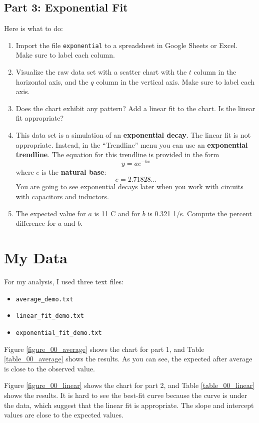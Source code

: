 \subsection{Part 3: Exponential Fit}
%
Here is what to do:
\begin{enumerate}
    \item Import the file \texttt{exponential} to a spreadsheet in Google Sheets or Excel. Make sure to label each column.
    \item Visualize the raw data set with a scatter chart with the $t$ column in the horizontal axis, and the $q$ column in the vertical axis. Make sure to label each axis.
    \item Does the chart exhibit any pattern? Add a linear fit to the chart. Is the linear fit appropriate?
    \item This data set is a simulation of an \textbf{exponential decay}. The linear fit is not appropriate. Instead, in the ``Trendline'' menu you can use an \textbf{exponential trendline}. The equation for this trendline is provided in the form
    \begin{equation}
        y = a e^{-bx}
    \end{equation}
    where $e$ is the \textbf{natural base}:
    \begin{equation*}
        e = 2.71828...
    \end{equation*}
    You are going to see exponential decays later when you work with circuits with capacitors and inductors.
    \item The expected value for $a$ is 11 C and for $b$ is 0.321 1/s. Compute the percent  difference for $a$ and $b$.
\end{enumerate}
%
\section{My Data}
%
For my analysis, I used three text files:
\begin{itemize}
    \item \texttt{average\_demo.txt}
    \item \texttt{linear\_fit\_demo.txt}
    \item \texttt{exponential\_fit\_demo.txt}
\end{itemize}
Figure \ref{figure_00_average} shows the chart for part 1, and Table \ref{table_00_average} shows the results. As you can see, the expected after average is close to the observed value.

Figure \ref{figure_00_linear} shows the chart for part 2, and Table \ref{table_00_linear} shows the results. It is hard to see the best-fit curve because the curve is under the data, which suggest that the linear fit is appropriate. The slope and intercept values are close to the expected values.


